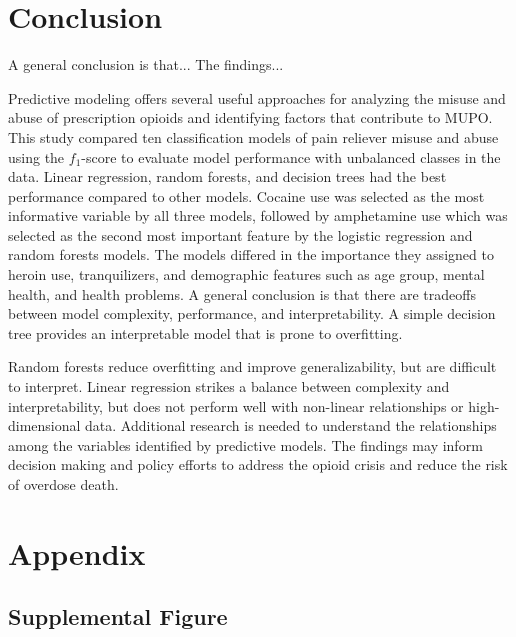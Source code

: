 \documentclass[sigconf]{acmart}
\begin{document}

\section{Conclusion}

A general conclusion is that... 
The findings...


Predictive modeling offers several useful approaches for analyzing the misuse
and abuse of prescription opioids and identifying factors that contribute to 
MUPO. This study compared ten classification models of pain reliever misuse 
and abuse using the $f_1$-score to evaluate model performance with unbalanced 
classes in the data. Linear regression, random forests, and decision trees 
had the best performance compared to other models. Cocaine use was selected 
as the most informative variable by all three models, followed by amphetamine 
use which was selected as the second most important feature by the logistic
regression and random forests models. The models differed in  the importance 
they assigned to heroin use, tranquilizers, and demographic features such as 
age group, mental health, and health problems. A general conclusion is that 
there are tradeoffs between model complexity, performance, and 
interpretability. A simple decision tree provides an interpretable model 
that is prone to overfitting. 

Random forests reduce overfitting and improve 
generalizability, but are difficult to interpret. Linear regression strikes 
a balance between complexity and interpretability, but does not perform well
with non-linear relationships or high-dimensional data. Additional research 
is needed to understand the relationships among the variables identified by 
predictive models. The findings may inform decision making and policy efforts 
to address the opioid crisis and reduce the risk of overdose death. 


 

\appendix

\section{Appendix}

\subsection{Supplemental Figure}
\end{document}
